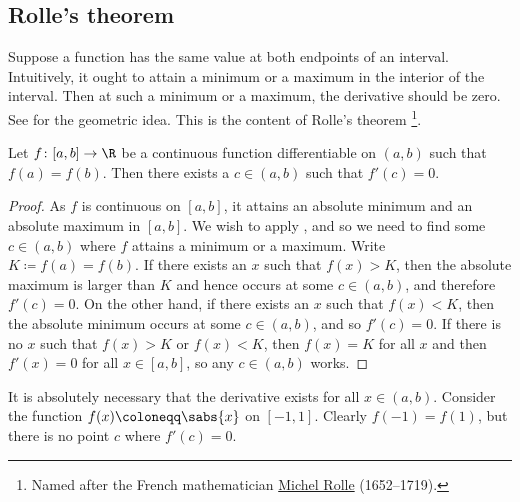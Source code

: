 \subsection{Rolle's theorem}

Suppose a function has the same value at both endpoints of an interval.
Intuitively, it ought to attain a minimum or a maximum in the interior of the
interval.
Then at such a minimum or a maximum, the derivative should be zero.
See  for the geometric idea.
This is the content of Rolle's theorem%
\footnote{Named after the French mathematician
\href{https://en.wikipedia.org/wiki/Michel_Rolle}{Michel Rolle}
(1652--1719).}.

\begin{myfigureht}
\caption{Point where the tangent line is horizontal, that is $f'(c) =
0$.\label{rollefig}}
\end{myfigureht}

\begin{thm}[Rolle] \label{thm:rolle}
Let $f \colon [a,b] \to \R$ be a continuous function
differentiable on $(a,b)$ such that $f(a) = f(b)$.
Then there exists a $c \in (a,b)$ such that $f'(c) = 0$.
\end{thm}

\begin{proof}
As $f$ is continuous on $[a,b]$, it attains an absolute minimum and an
absolute 
maximum in $[a,b]$.  We wish to apply , and
so we need to find some $c \in (a,b)$ where $f$ attains a minimum or a
maximum.
Write $K \coloneqq f(a) = f(b)$.
If there exists an $x$ such that $f(x) > K$, then the absolute
maximum is larger than $K$ and hence occurs at some $c \in (a,b)$, and
therefore $f'(c) = 0$.  On the other hand, if there exists an $x$
such that $f(x) < K$, then the absolute minimum occurs at some
$c \in (a,b)$, and so $f'(c) = 0$.  If there is no $x$ such that
$f(x) > K$ or
$f(x) < K$, then $f(x) = K$ for all $x$ and then
$f'(x) = 0$ for all $x \in [a,b]$, so any $c \in (a,b)$ works.
\end{proof}

It is absolutely necessary that the derivative exists for all $x
\in (a,b)$.  Consider the function $f(x) \coloneqq \sabs{x}$ on $[-1,1]$.
Clearly $f(-1) = f(1)$, but there is no point $c$ where $f'(c) = 0$.

